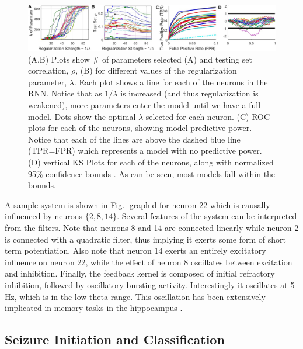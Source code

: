 \documentclass[11pt,a4paper,final]{article}
\begin{document}
\begin{figure}[!ht]
	\centering
	\includegraphics[width=170mm]{regpath}
	\caption[Regularization Path]{
		(A,B) Plots show \# of parameters selected (A) and testing set correlation, $\rho$, (B) for different values of the regularization parameter, $\lambda$. Each plot shows a line for each of the \nn{} neurons in the RNN. Notice that as $1/\lambda$ is increased (and thus regularization is weakened), more parameters enter the model until we have a full model. Dots show the optimal $\lambda$ selected for each neuron.
		(C) ROC plots for each of the \nn{} neurons, showing model predictive power. Notice that each of the lines are above the dashed blue line (TPR=FPR) which represents a model with no predictive power.
		(D) vertical KS Plots for each of the \nn{} neurons, along with normalized 95\% confidence bounds \citep{song13sparse}. As can be seen, most models fall within the bounds.}
	\label{regpath}
\end{figure}

A sample system is shown in Fig. \ref{graph}d for neuron 22 which is causally influenced by neurons $\{2,8,14\}$.
Several features of the system can be interpreted from the filters.
Note that neurons 8 and 14 are connected linearly while neuron 2 is connected with a quadratic filter, thus implying it exerts some form of short term potentiation.
Also note that neuron 14 exerts an entirely excitatory influence on neuron 22, while the effect of neuron 8 oscillates between excitation and inhibition.
Finally, the feedback kernel is composed of initial refractory inhibition, followed by oscillatory bursting activity.
Interestingly it oscillates at 5 Hz, which is in the low theta range. 
This oscillation has been extensively implicated in memory tasks in the hippocampus \citep{buzsaki06,sandler14}.

    \subsection{Seizure Initiation and Classification}
\end{document}
